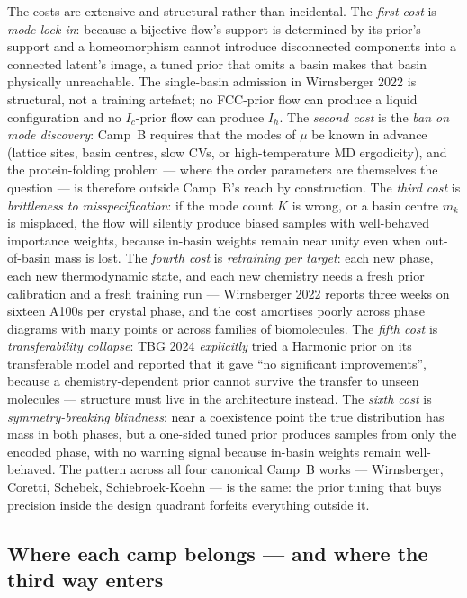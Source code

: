 \documentclass[11pt,letterpaper]{article}
\theoremstyle{plain}
\begin{document}
The costs are extensive and structural rather than incidental. The
\emph{first cost} is \emph{mode lock-in}: because a bijective flow's
support is determined by its prior's support and a homeomorphism cannot
introduce disconnected components into a connected latent's image, a tuned
prior that omits a basin makes that basin physically unreachable. The
single-basin admission in Wirnsberger 2022 is structural, not a training
artefact; no FCC-prior flow can produce a liquid configuration and no
$I_c$-prior flow can produce $I_h$. The \emph{second cost} is the
\emph{ban on mode discovery}: Camp~B requires that the modes of $\mu$ be
known in advance (lattice sites, basin centres, slow CVs, or
high-temperature MD ergodicity), and the protein-folding problem ---
where the order parameters are themselves the question --- is therefore
outside Camp~B's reach by construction. The \emph{third cost} is
\emph{brittleness to misspecification}: if the mode count $K$ is wrong, or
a basin centre $m_k$ is misplaced, the flow will silently produce biased
samples with well-behaved importance weights, because in-basin weights
remain near unity even when out-of-basin mass is lost. The \emph{fourth
cost} is \emph{retraining per target}: each new phase, each new
thermodynamic state, and each new chemistry needs a fresh prior
calibration and a fresh training run --- Wirnsberger 2022 reports three
weeks on sixteen A100s per crystal phase, and the cost amortises poorly
across phase diagrams with many points or across families of biomolecules.
The \emph{fifth cost} is \emph{transferability collapse}: TBG 2024
\emph{explicitly} tried a Harmonic prior on its transferable model and
reported that it gave ``no significant improvements'', because a
chemistry-dependent prior cannot survive the transfer to unseen molecules
--- structure must live in the architecture instead. The \emph{sixth cost}
is \emph{symmetry-breaking blindness}: near a coexistence point the true
distribution has mass in both phases, but a one-sided tuned prior produces
samples from only the encoded phase, with no warning signal because
in-basin weights remain well-behaved. The pattern across all four canonical
Camp~B works --- Wirnsberger, Coretti, Schebek, Schiebroek-Koehn --- is the
same: the prior tuning that buys precision inside the design quadrant
forfeits everything outside it.

\subsection*{Where each camp belongs --- and where the third way enters}
\end{document}
